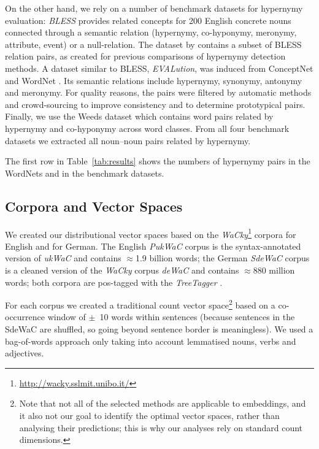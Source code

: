 \documentclass[11pt,a4paper]{article}
\begin{document}
On the other hand, we rely on a number of benchmark datasets for
hypernymy evaluation: \textit{BLESS} \cite{Baroni/Lenci:11} provides
related concepts for 200 English concrete nouns connected through a
semantic relation (hypernymy, co-hyponymy, meronymy, attribute, event)
or a null-relation. The dataset by  contains
a subset of BLESS relation pairs, as created for previous comparisons
of hypernymy detection methods. A dataset similar to BLESS,
\textit{EVALution}, was induced from ConceptNet and WordNet
\cite{SantusEtAl:15}. Its semantic relations include hypernymy,
synonymy, antonymy and meronymy. For quality reasons, the pairs were
filtered by automatic methods and crowd-sourcing to improve
consistency and to determine prototypical pairs. Finally, we use the
Weeds dataset \cite{WeedsEtAl:04,Weeds/Weir:05} which contains word
pairs related by hypernymy and co-hyponymy across word classes. From
all four benchmark datasets we extracted all noun--noun pairs related
by hypernymy.

The first row in Table~\ref{tab:results} shows the numbers of
hypernymy pairs in the WordNets and in the benchmark datasets.

\subsection{Corpora and Vector Spaces}
\label{sec:spaces}

We created our distributional vector spaces based on the
\textit{WaCky}\footnote{\url{http://wacky.sslmit.unibo.it/}} corpora
\cite{BaroniEtAl:09} for English and for German. The English
\textit{PukWaC} corpus is the syntax-annotated version of
\textit{ukWaC} \cite{FerraresiEtAl:08} and contains $\approx$1.9
billion words; the German \textit{SdeWaC} corpus
\cite{Faass/Eckart:13} is a cleaned version of the \textit{WaCky}
corpus \textit{deWaC} and contains $\approx$880 million words; both
corpora are pos-tagged with the \textit{TreeTagger} \cite{Schmid:94}.

For each corpus we created a traditional count vector
space\footnote{Note that not all of the selected methods are
  applicable to embeddings, and it also not our goal to identify the
  optimal vector spaces, rather than analysing their predictions; this
  is why our analyses rely on standard count dimensions.} based on a
co-occurrence window of $\pm$~10 words within sentences (because
sentences in the SdeWaC are shuffled, so going beyond sentence border
is meaningless). We used a bag-of-words approach only taking into
account lemmatised nouns, verbs and adjectives.
\end{document}
